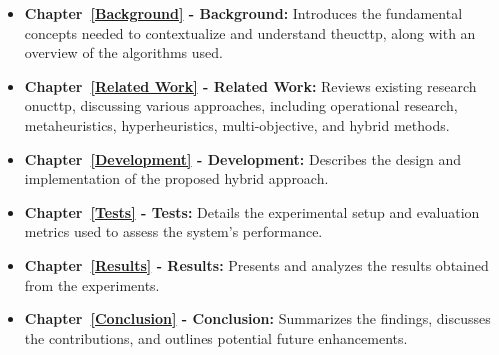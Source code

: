 \begin{itemize}
\item \textbf{Chapter~\ref{Background} - Background:} Introduces the fundamental concepts needed to contextualize and understand the\ac{ucttp}, along with an overview of the algorithms used.
\item \textbf{Chapter~\ref{Related Work} -  Related Work:} Reviews existing research on\ac{ucttp}, discussing various approaches, including operational research, metaheuristics, hyperheuristics, multi-objective, and hybrid methods.
\item \textbf{Chapter~\ref{Development} -  Development:} Describes the design and implementation of the proposed hybrid approach.
\item \textbf{Chapter~\ref{Tests} - Tests:} Details the experimental setup and evaluation metrics used to assess the system's performance.
\item \textbf{Chapter~\ref{Results} -  Results:} Presents and analyzes the results obtained from the experiments. 
\item \textbf{Chapter~\ref{Conclusion} - Conclusion:} Summarizes the findings, discusses the contributions, and outlines potential future enhancements.
\end{itemize}



